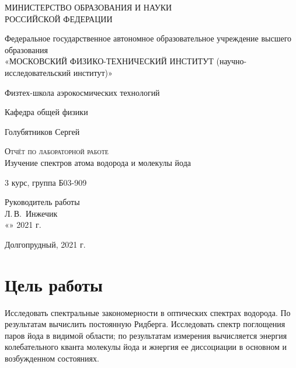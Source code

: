 \documentclass[14pt,a4paper]{scrartcl}
\begin{document}
\begin{titlepage}
  \begin{center}
    \large
    МИНИСТЕРСТВО ОБРАЗОВАНИЯ И НАУКИ\\ РОССИЙСКОЙ ФЕДЕРАЦИИ
     
    \vspace{0.5cm}
 
    Федеральное государственное автономное образовательное учреждение высшего образования \\ «МОСКОВСКИЙ ФИЗИКО-ТЕХНИЧЕСКИЙ ИНСТИТУТ (научно-исследовательский институт)»
    \vspace{0.25cm}

	Физтех-школа аэрокосмических технологий
     
    Кафедра общей физики
    \vfill
     
     

    Голубятников Сергей
    \vfill
 
    \textsc{Отчёт по лабораторной работе}\\[5mm]
     
    {\LARGE Изучение спектров атома водорода и молекулы йода}
  \bigskip
     
   3 курс, группа Б03-909
\end{center}
\vfill
 
\newlength{\ML}
\hfill
\begin{minipage}{0.4\textwidth}
  Руководитель работы\\
  \underline{\hspace{\ML}} Л.\,В.~Инжечик\\
  «\underline{\hspace{0.7cm}}» \underline{\hspace{2cm}} 2021 г.
\end{minipage}%
\bigskip
 

\vfill
 
\begin{center}
  Долгопрудный, 2021 г.
\end{center}
\end{titlepage}


\tableofcontents
{}
\newpage


\section{Цель работы}
Исследовать спектральные закономерности в оптических спектрах водорода. По результатам вычислить постоянную Ридберга. 
Исследовать спектр поглощения паров йода в видимой области; по результатам измерения вычисляется энергия колебательного кванта молекулы йода и жнергия ее диссоциации в основном и возбужденном состояниях.
\end{document}
